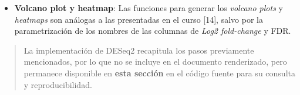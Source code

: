 \documentclass[
  12pt,
  letterpaper,
  DIV=11,
  numbers=noendperiod]{scrartcl}
\newenvironment{Shaded}{\begin{snugshade}}{\end{snugshade}}
\newcommand{\AttributeTok}[1]{\textcolor[rgb]{0.40,0.45,0.13}{#1}}
\newcommand{\CommentTok}[1]{\textcolor[rgb]{0.37,0.37,0.37}{#1}}
\newcommand{\ConstantTok}[1]{\textcolor[rgb]{0.56,0.35,0.01}{#1}}
\newcommand{\ControlFlowTok}[1]{\textcolor[rgb]{0.00,0.23,0.31}{\textbf{#1}}}
\newcommand{\FloatTok}[1]{\textcolor[rgb]{0.68,0.00,0.00}{#1}}
\newcommand{\FunctionTok}[1]{\textcolor[rgb]{0.28,0.35,0.67}{#1}}
\newcommand{\NormalTok}[1]{\textcolor[rgb]{0.00,0.23,0.31}{#1}}
\newcommand{\OtherTok}[1]{\textcolor[rgb]{0.00,0.23,0.31}{#1}}
\newcommand{\SpecialCharTok}[1]{\textcolor[rgb]{0.37,0.37,0.37}{#1}}
\newcommand{\StringTok}[1]{\textcolor[rgb]{0.13,0.47,0.30}{#1}}
\providecommand{\tightlist}{%
  \setlength{\itemsep}{0pt}\setlength{\parskip}{0pt}}
\begin{document}
\begin{Shaded}
\end{Shaded}

\begin{itemize}
\tightlist
\item
  \textbf{Volcano plot y heatmap}: Las funciones para generar los
  \emph{volcano plots} y \emph{heatmaps} son análogas a las presentadas
  en el curso {[}14{]}, salvo por la parametrización de los nombres de
  las columnas de \emph{Log2 fold-change} y FDR.
\end{itemize}

\begin{quote}
La implementación de DESeq2 recapitula los pasos previamente
mencionados, por lo que no se incluye en el documento renderizado, pero
permanece disponible en \textbf{esta sección} en el código fuente para
su consulta y reproducibilidad.
\end{quote}
\end{document}
